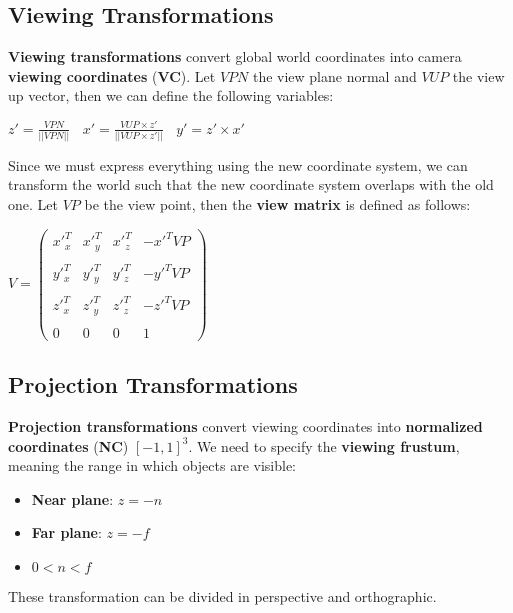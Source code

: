 \documentclass{article}
\begin{document}
\subsection{Viewing Transformations}
\textbf{Viewing transformations} convert global world coordinates into camera \textbf{viewing coordinates} (\textbf{VC}). Let $VPN$ the view plane normal and $VUP$ the view up vector, then we can define the following variables:
\begin{center}
    $z' = \displaystyle\frac{VPN}{||VPN||} \ \ \ \ x' = \displaystyle\frac{VUP \times z'}{||VUP \times z'||} \ \ \ \ y' = z' \times x' $
\end{center}
Since we must express everything using the new coordinate system, we can transform the world such that the new coordinate system overlaps with the old one. Let $VP$ be the view point, then the \textbf{view matrix} is defined as follows:
\begin{center}
    $V = \begin{pmatrix}
        x'^T_x & x'^T_y & x'^T_z & -x'^TVP \\\\
        y'^T_x & y'^T_y & y'^T_z & -y'^TVP \\\\
        z'^T_x & z'^T_y & z'^T_z & -z'^TVP \\\\
        0 & 0 & 0 & 1
    \end{pmatrix}$
\end{center}
\subsection{Projection Transformations}
\textbf{Projection transformations} convert viewing coordinates into \textbf{normalized coordinates} (\textbf{NC}) $[-1, 1]^3$. We need to specify the \textbf{viewing frustum}, meaning the range in which objects are visible:
\begin{itemize}
    \item \textbf{Near plane}: $z = -n$
    \item \textbf{Far plane}: $z = -f$
    \item $0 < n < f$
\end{itemize}
These transformation can be divided in perspective and orthographic.
\end{document}
